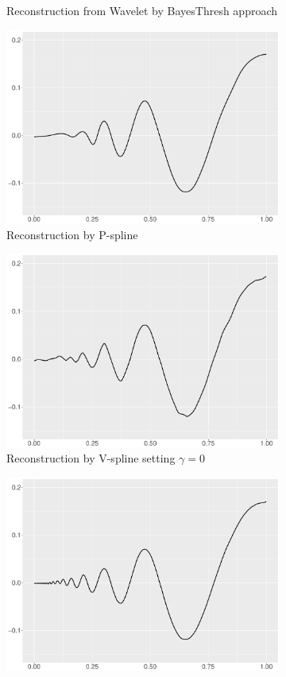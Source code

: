 \begin{figure}
\begin{subfigure}{0.45\textwidth}
    \caption{Reconstruction from Wavelet by BayesThresh approach}
    \end{subfigure}
    \begin{subfigure}{0.45\textwidth}
    \centering
    \includegraphics[width=\linewidth,height=0.45\textwidth]{Chapters/02TractorSplineTheory/plot/ggplot/ggDopplerPSpline.pdf}
    \caption{Reconstruction by P-spline}
    \end{subfigure}
    \begin{subfigure}{0.45\textwidth}
    \centering
    \includegraphics[width=\linewidth,height=0.45\textwidth]{Chapters/02TractorSplineTheory/plot/ggplot/ggDopplerGamma.pdf}
    \caption{Reconstruction by V-spline setting $\gamma=0$}
    \end{subfigure}
  \begin{subfigure}{0.45\textwidth}
    \centering
    \includegraphics[width=\linewidth,height=0.45\textwidth]{Chapters/02TractorSplineTheory/plot/ggplot/ggDopplerTractorAPT.pdf}

\end{subfigure}
\end{figure}
